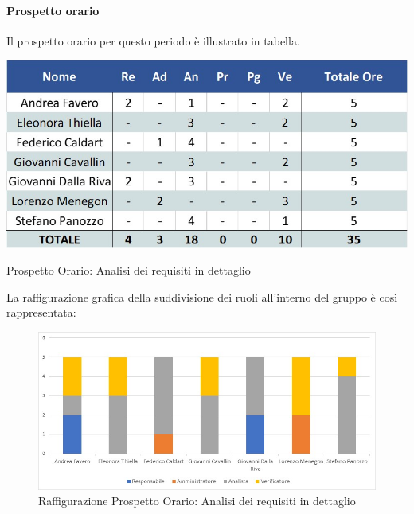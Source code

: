 \paragraph{Prospetto orario}
Il prospetto orario per questo periodo è illustrato in tabella.
\begin{table}[H]
	\centerline{\includegraphics[scale=0.7]{img/Preventivo/AnalisiRequisitiDettaglioOrario.jpg}}
	\caption{Prospetto Orario: Analisi dei requisiti in dettaglio}
	\clearpage
\end{table}
La raffigurazione grafica della suddivisione dei ruoli all'interno del gruppo è così rappresentata: 
\begin{figure}[H]
	\centerline{\includegraphics[scale=0.85]{img/Preventivo/Istogrammi/AnalisiRequisitiDettaglio.jpg}}
	\caption{Raffigurazione Prospetto Orario: Analisi dei requisiti in dettaglio}
	\clearpage
\end{figure}
\newpage
